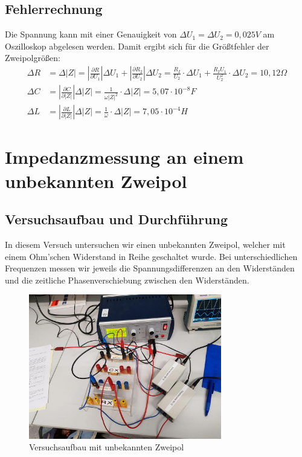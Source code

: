 \documentclass{scrartcl}
\begin{document}
\subsection{Fehlerrechnung}
Die Spannung kann mit einer Genauigkeit von $\Delta U_{1} = \Delta U_{2} = 0,025V$ am Oszilloskop abgelesen werden. Damit ergibt sich für die Größtfehler der Zweipolgrößen:
\begin{align*}
\Delta R &= \Delta |Z| = \left| \frac{\partial R}{\partial U_{1}} \right| \Delta U_{1} + \left| \frac{\partial R_{2}}{\partial U_{2}} \right| \Delta U_{2} = \frac{R_{I}}{U_{2}} \cdot \Delta U_{1} + \frac{R_{I}U_{1}}{U_{2}^2} \cdot \Delta U_{2} = 10,12 \Omega \\
\Delta C &= \left| \frac{\partial C}{\partial |Z|} \right| \Delta |Z| = \frac{1}{\omega |Z|^2} \cdot \Delta |Z| = 5,07 \cdot 10^{-8} F\\
\Delta L &= \left| \frac{\partial L}{\partial |Z|} \right| \Delta |Z| = \frac{1}{\omega} \cdot \Delta |Z| = 7,05 \cdot 10^{-4} H
\end{align*}
\section{Impedanzmessung an einem unbekannten Zweipol}
\subsection{Versuchsaufbau und Durchführung}
In diesem Versuch untersuchen wir einen unbekannten Zweipol, welcher mit einem Ohm'schen Widerstand in Reihe geschaltet wurde. Bei unterschiedlichen Frequenzen messen wir jeweils  die Spannungsdifferenzen an den Widerständen und die zeitliche Phasenverschiebung zwischen den Widerständen.

\begin{figure}[H]
  \centering
    \includegraphics[width=0.75\textwidth]{V_3_Aufbau.jpg}
  \caption{Versuchsaufbau mit unbekannten Zweipol}
  \label{fig:v3a}
\end{figure}
\end{document}
